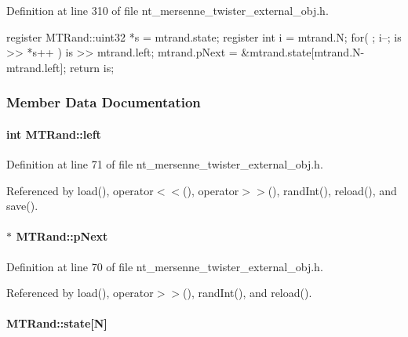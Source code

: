Definition at line 310 of file nt\_\-mersenne\_\-twister\_\-external\_\-obj.h.




\begin{DoxyCode}
{
    register MTRand::uint32 *s = mtrand.state;
    register int i = mtrand.N;
    for( ; i--; is >> *s++ ) {}
    is >> mtrand.left;
    mtrand.pNext = &mtrand.state[mtrand.N-mtrand.left];
    return is;
}
\end{DoxyCode}




\subsubsection{Member Data Documentation}
\paragraph[{left}]{\setlength{\rightskip}{0pt plus 5cm}int {\bf MTRand::left}}\hfill\label{class_m_t_rand_a98eabf568c88f121e44f487397f32495}


Definition at line 71 of file nt\_\-mersenne\_\-twister\_\-external\_\-obj.h.



Referenced by load(), operator$<$$<$(), operator$>$$>$(), randInt(), reload(), and save().

\paragraph[{pNext}]{$\ast$ {\bf MTRand::pNext}}\hfill\label{class_m_t_rand_a2b80858137c88fe69d4d2bdc665bcf93}


Definition at line 70 of file nt\_\-mersenne\_\-twister\_\-external\_\-obj.h.



Referenced by load(), operator$>$$>$(), randInt(), and reload().

\paragraph[{state}]{ {\bf MTRand::state}\mbox{[}N\mbox{]}}\hfill\label{class_m_t_rand_a2c87f537429bf0b0f6a452c22b9eebba}


